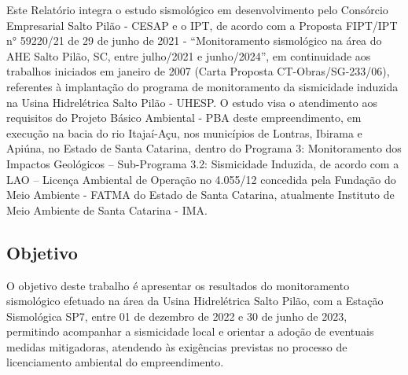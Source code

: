 \par{Este Relatório integra o estudo sismológico em desenvolvimento pelo Consórcio Empresarial Salto Pilão - CESAP e o IPT, de acordo com a Proposta FIPT/IPT n° 59220/21 de 29 de junho de 2021 - “Monitoramento sismológico na área do AHE Salto Pilão, SC, entre julho/2021 e junho/2024”, em continuidade aos trabalhos iniciados em janeiro de 2007 (Carta Proposta CT-Obras/SG-233/06), referentes à implantação do programa de monitoramento da sismicidade induzida na Usina Hidrelétrica Salto Pilão - UHESP. O estudo visa o atendimento aos requisitos do Projeto Básico Ambiental - PBA deste empreendimento, em execução na bacia do rio Itajaí-Açu, nos municípios de Lontras, Ibirama e Apiúna, no Estado de Santa Catarina, dentro do Programa 3: Monitoramento dos Impactos Geológicos – Sub-Programa 3.2: Sismicidade Induzida, de acordo com a LAO – Licença Ambiental de Operação no 4.055/12 concedida pela Fundação do Meio Ambiente - FATMA do Estado de Santa Catarina, atualmente Instituto de Meio Ambiente de Santa Catarina - IMA.}

\subsection{Objetivo}
\par{O objetivo deste trabalho é apresentar os resultados do monitoramento sismológico efetuado na área da Usina Hidrelétrica Salto Pilão, com a Estação Sismológica SP7, entre 01 de dezembro de 2022 e 30 de junho de 2023, permitindo acompanhar a sismicidade local e orientar a adoção de eventuais medidas mitigadoras, atendendo às exigências previstas no processo de licenciamento ambiental do empreendimento.}
